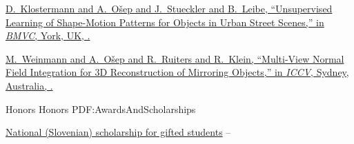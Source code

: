 \documentclass[letterpaper,MMMyyyy,nonstopmode]{simpleresumecv}
\begin{document}
\begin{Body}
\Gap
\href{https://www.vision.rwth-aachen.de/media/papers/bmvc16_klostermann_final.pdf}
{D.~Klostermann and \underline{A.~Ošep} and J.~Stueckler and B.~Leibe,
``Unsupervised Learning of Shape-Motion Patterns for Objects in Urban Street Scenes,''
in \textit{BMVC},
York, UK,
.}

%
%

\Gap
\href{https://www.vision.rwth-aachen.de/media/papers/weinmann_reconstruction_of_mirroring_objects_iccv2013.pdf}
{M.~Weinmann and \underline{A.~Ošep} and R.~Ruiters and R.~Klein,
``Multi-View Normal Field Integration for 3D Reconstruction of Mirroring Objects,''
in \textit{ICCV},
Sydney, Australia,
.}

\endgroup

\Section
{Honors}
{Honors}
{PDF:AwardsAndScholarships}

\Gap
\BulletItem
\href{http://www.sklad-kadri.si/en/scholarships/zois-scholarships/}{National (Slovenian) scholarship for gifted students}
\hfill
{} --
%
%
%
%
%


\end{Body}
\end{document}
